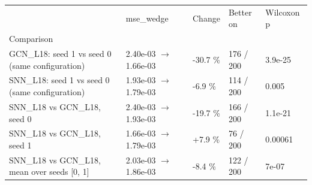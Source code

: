 \begin{tabular}{lllll}
\toprule
 & mse\_wedge & Change & Better on & Wilcoxon p \\
Comparison &  &  &  &  \\
\midrule
GCN\_L18: seed 1 vs seed 0 (same configuration) & 2.40e-03 $\rightarrow$ 1.66e-03 & -30.7 \% & 176 / 200 & 3.9e-25 \\
SNN\_L18: seed 1 vs seed 0 (same configuration) & 1.93e-03 $\rightarrow$ 1.79e-03 & -6.9 \% & 114 / 200 & 0.005 \\
SNN\_L18 vs GCN\_L18, seed 0 & 2.40e-03 $\rightarrow$ 1.93e-03 & -19.7 \% & 166 / 200 & 1.1e-21 \\
SNN\_L18 vs GCN\_L18, seed 1 & 1.66e-03 $\rightarrow$ 1.79e-03 & +7.9 \% & 76 / 200 & 0.00061 \\
SNN\_L18 vs GCN\_L18, mean over seeds [0, 1] & 2.03e-03 $\rightarrow$ 1.86e-03 & -8.4 \% & 122 / 200 & 7e-07 \\
\bottomrule
\end{tabular}
